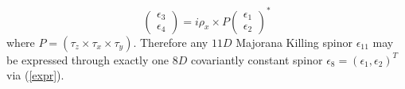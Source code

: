 \documentclass[a4paper,12pt]{article}
\begin{document}
\begin{appendix}
\begin{equation}
\left( \begin{array}{c} \epsilon_3 \\ \epsilon_4 \end{array}
\right) = i \rho_x \times P \left( \begin{array}{c} \epsilon_1 \\
\epsilon_2 \end{array} \right)^*
\end{equation}
where $P = (\tau_z \times \tau_x \times \tau_y)$. Therefore any
$11D$ Majorana Killing spinor $\epsilon_{11}$ may be expressed
through exactly one $8D$ covariantly constant spinor
$\epsilon_{8}=(\epsilon_1,\epsilon_2)^T$ via (\ref{expr}).


\end{appendix}
\end{document}
